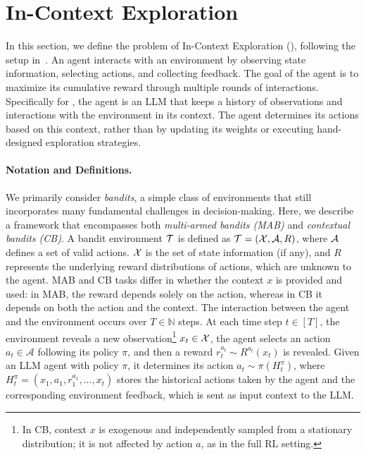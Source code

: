 \section{In-Context Exploration}
\label{sec: icdm}

In this section, we define the problem of In-Context Exploration (\ICE), following the setup in~\cite{krishnamurthy2024can}. An agent interacts with an environment by observing state information, selecting actions, and collecting feedback. The goal of the agent is to maximize its cumulative reward through multiple rounds of interactions. 
Specifically for \ICE, the agent is an LLM that keeps a history of observations and interactions with the environment in its context. The agent determines its actions based on this context, rather than by updating its weights or executing hand-designed exploration strategies.

\paragraph{Notation and Definitions.}
\label{sec:notations}
We primarily consider \textit{bandits}, a simple class of environments that still incorporates many fundamental challenges in decision-making. Here, we describe a framework that encompasses both \textit{multi-armed bandits (MAB)} and \textit{contextual bandits (CB)}. A bandit environment ${\mathcal{T}}$ is defined as ${\mathcal{T}}=({\mathcal{X}}, {\mathcal{A}}, R)$, where ${\mathcal{A}}$ defines a set of valid actions. ${\mathcal{X}}$ is the set of state information (if any), and $R$ represents the underlying reward distributions of actions, which are unknown to the agent.
MAB and CB tasks differ in whether the context $x$ is provided and used: in MAB, the reward depends solely on the action, whereas in CB it depends on both the action and the context. 
The interaction between the agent and the environment occurs over $T \in \mathbb{N}$ steps. At each time step $t \in [T]$, the environment reveals a new observation\footnote{In CB, context $x$ is exogenous and independently sampled from a stationary distribution; it is not affected by action $a$, as in the full RL setting.} $x_t \in {\mathcal{X}}$, the agent selects an action $a_t \in \mathcal{A}$ following its policy $\pi$, and then a reward $r_t^{a_t} \sim R^{a_t}(x_t)$ is revealed. 
Given an LLM agent with policy $\pi$, it determines its action $a_t \sim \pi(H^\pi_t)$, where $H^\pi_t = (x_1, a_1, r_1^{a_1}, \ldots, x_t)$ stores the historical actions taken by the agent and the corresponding environment feedback, which is sent as input context to the LLM. 

